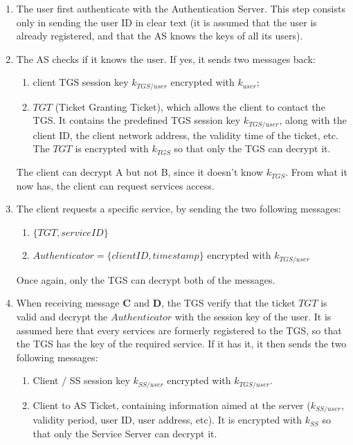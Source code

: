 \begin{enumerate}
	\item The user first authenticate with the Authentication Server. This step consists only in sending the user ID in clear text (it is assumed that the user is already registered, and that the AS knows the keys of all its users).
	\item The AS checks if it knows the user. If yes, it sends two messages back: 
	\begin{enumerate}[label=\bfseries\Alph*)]
		\item client TGS session key $k_{TGS/user}$ encrypted with $k_{user}$;
		\item $TGT$ (Ticket Granting Ticket), which allows the client to contact the TGS. It contains the predefined TGS session key  $k_{TGS/user}$, along with the client ID, the client network address, the validity time of the ticket, etc. The $TGT$ is encrypted with $k_{TGS}$ so that only the TGS can decrypt it.
	\end{enumerate}
	The client can decrypt A but not B, since it doesn't know $k_{TGS}$. From what it now has, the client can request services access.
	
	\item The client requests a specific service, by sending the two following messages:
	\begin{enumerate}[label=\bfseries\Alph*), resume]
		\item $\lbrace TGT, service ID \rbrace$
		\item $Authenticator=\lbrace client ID, timestamp \rbrace$ encrypted with $k_{TGS/user}$ 
	\end{enumerate}
	Once again, only the TGS can decrypt both of the messages.
	
	\item When receiving message \textbf{C} and \textbf{D}, the TGS verify that the ticket $TGT$ is valid and decrypt the $Authenticator$ with the session key of the user. It is assumed here that every services are formerly registered to the TGS, so that the TGS has the key of the required service. If it has it, it then sends the two following messages:
	\begin{enumerate}[label=\bfseries\Alph*), resume]
		\item Client / SS session key $k_{SS/user}$ encrypted with $k_{TGS/user}$.
		\item Client to AS Ticket, containing information aimed at the server ($k_{SS/user}$, validity period, user ID, user address, etc). It is encrypted with $k_{SS}$ so that only the Service Server can decrypt it.
	\end{enumerate}
	

\end{enumerate}
